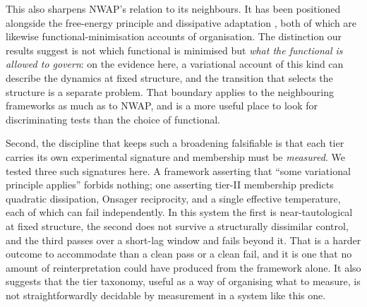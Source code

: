 \documentclass[aps,pre,preprint,superscriptaddress,nofootinbib,longbibliography]{revtex4-2}
\begin{document}
This also sharpens NWAP's relation to its neighbours. It has been positioned alongside the free-energy principle \cite{r34} and dissipative adaptation \cite{r35}, both of which are likewise functional-minimisation accounts of organisation. The distinction our results suggest is not which functional is minimised but \emph{what the functional is allowed to govern}: on the evidence here, a variational account of this kind can describe the dynamics at fixed structure, and the transition that selects the structure is a separate problem. That boundary applies to the neighbouring frameworks as much as to NWAP, and is a more useful place to look for discriminating tests than the choice of functional.

Second, the discipline that keeps such a broadening falsifiable is that each tier carries its own experimental signature and membership must be \emph{measured}. We tested three such signatures here. A framework asserting that ``some variational principle applies'' forbids nothing; one asserting tier-II membership predicts quadratic dissipation, Onsager reciprocity, and a single effective temperature, each of which can fail independently. In this system the first is near-tautological at fixed structure, the second does not survive a structurally dissimilar control, and the third passes over a short-lag window and fails beyond it. That is a harder outcome to accommodate than a clean pass or a clean fail, and it is one that no amount of reinterpretation could have produced from the framework alone. It also suggests that the tier taxonomy, useful as a way of organising what to measure, is not straightforwardly decidable by measurement in a system like this one.
\end{document}
